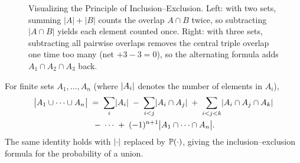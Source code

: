 \begin{figure}[H]
\caption{Visualizing the Principle of Inclusion--Exclusion. Left: with two sets, summing $|A| + |B|$ counts the overlap $A \cap B$ twice, so subtracting $|A \cap B|$ yields each element counted once. Right: with three sets, subtracting all pairwise overlaps removes the central triple overlap one time too many (net $+3 - 3 = 0$), so the alternating formula adds $A_1 \cap A_2 \cap A_3$ back.}
\label{ch2:fig-incexc}
\end{figure}

\begin{theorem}
\label{ch2:thm-incexc}
For finite sets $A_1, \dots, A_n$ (where $\abs{A_i}$ denotes the number of elements in $A_i$),
\begin{multline*}
  \abs[\big]{A_1 \cup \cdots \cup A_n}
  \;=\; \sum_{i} \abs{A_i}
  \;-\; \sum_{i<j} \abs{A_i \cap A_j}
  \;+\; \sum_{i<j<k} \abs{A_i \cap A_j \cap A_k} \\
  \;-\; \cdots
  \;+\; (-1)^{n+1}\abs[\big]{A_1 \cap \cdots \cap A_n}.
\end{multline*}
The same identity holds with $\abs{\cdot}$ replaced by $\P(\cdot)$, giving the
inclusion--exclusion formula for the probability of a union.
\end{theorem}

